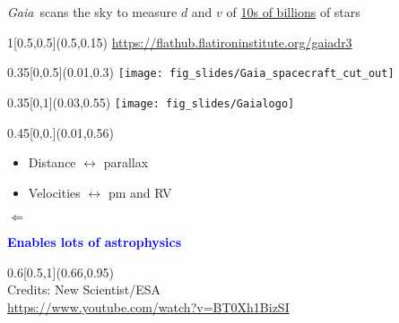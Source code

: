 \documentclass[xcolor=dvipsnames,professionalfonts, aspectratio=169]{beamer}
\begin{document}
\begin{frame}{\emph{Gaia}~scans the sky to measure $d$ and
    $v$ of \underline{10s of billions} of stars}


  \begin{textblock}{1}[0.5,0.5](0.5,0.15)
    \centering\small
    \url{https://flathub.flatironinstitute.org/gaiadr3}
  \end{textblock}


  \begin{textblock}{0.35}[0,0.5](0.01,0.3)
    \texttt{[image: fig\_slides/Gaia\_spacecraft\_cut\_out]}
  \end{textblock}
  \begin{textblock}{0.35}[0,1](0.03,0.55)
    \texttt{[image: fig\_slides/Gaialogo]}
  \end{textblock}

  \begin{textblock}{0.45}[0,0.](0.01,0.56)
    \begin{itemize}\color{black}
    \item Distance $\leftrightarrow$ parallax
    \item Velocities $\leftrightarrow$ pm and RV
    \end{itemize}
    \vspace*{-10pt}
    \hspace*{70pt}\begin{sideways}
      $\Leftarrow$
    \end{sideways}

    \textbf{\textcolor{Blue}{Enables lots of astrophysics}}
  \end{textblock}

  \begin{textblock}{0.6}[0.5,1](0.66,0.95)
    \centering
    \\
    \textcolor{gray!50}{\tiny Credits: New Scientist/ESA}\\[-7pt]
    \textcolor{gray!50}{\tiny \url{https://www.youtube.com/watch?v=BT0Xh1BizSI}}
  \end{textblock}
\end{frame}
\end{document}
